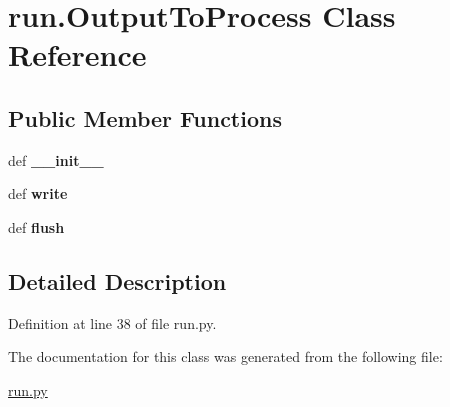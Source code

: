 \hypertarget{classrun_1_1_output_to_process}{
\section{run.OutputToProcess Class Reference}
\label{classrun_1_1_output_to_process}
}
\subsection*{Public Member Functions}
\begin{DoxyCompactItemize}
\item 
\hypertarget{classrun_1_1_output_to_process_a937ecd7365626754b6798a6e8839f99d}{
def {\bfseries \_\-\_\-init\_\-\_\-}}
\label{classrun_1_1_output_to_process_a937ecd7365626754b6798a6e8839f99d}

\item 
\hypertarget{classrun_1_1_output_to_process_a9740a62e197ca9807248f82bde373fd6}{
def {\bfseries write}}
\label{classrun_1_1_output_to_process_a9740a62e197ca9807248f82bde373fd6}

\item 
\hypertarget{classrun_1_1_output_to_process_a83d9e1805fb6d3d173ba68ee69329834}{
def {\bfseries flush}}
\label{classrun_1_1_output_to_process_a83d9e1805fb6d3d173ba68ee69329834}

\end{DoxyCompactItemize}


\subsection{Detailed Description}


Definition at line 38 of file run.py.



The documentation for this class was generated from the following file:\begin{DoxyCompactItemize}
\item 
\hyperlink{run_8py}{run.py}\end{DoxyCompactItemize}
